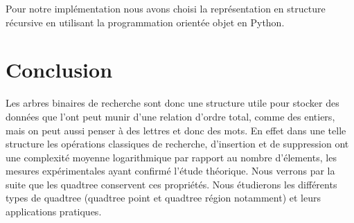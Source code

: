 \documentclass{report}
\begin{document}
Pour notre implémentation nous avons choisi la représentation en structure récursive en utilisant la programmation orientée objet en Python.

\chapter*{Conclusion}

Les arbres binaires de recherche sont donc une structure utile pour stocker des données que l'ont peut munir d'une relation d'ordre total, comme des entiers, mais on peut aussi penser à des lettres et donc des mots. En effet dans une telle structure les opérations classiques de recherche, d'insertion et de suppression ont une complexité moyenne logarithmique par rapport au nombre d'élements, les mesures expérimentales ayant confirmé l'étude théorique. Nous verrons par la suite que les quadtree conservent ces propriétés. Nous étudierons les différents types de quadtree (quadtree point et quadtree région notamment) et leurs applications pratiques.


\nocite{*}


\end{document}
